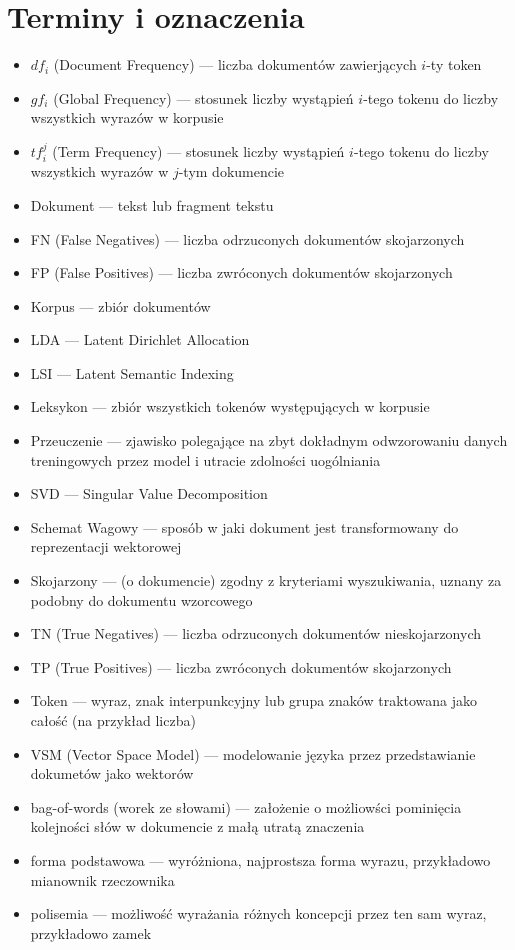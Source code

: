 \documentclass[11pt,a4paper]{article}
\begin{document}
\pagebreak

\section{Terminy i oznaczenia}
\label{sec:terms}

\begin{itemize}
\item $df_i$ (Document Frequency) --- liczba dokumentów zawierjących $i$-ty token
\item $gf_i$ (Global Frequency) --- stosunek liczby wystąpień $i$-tego tokenu do liczby wszystkich wyrazów w korpusie
\item $tf_i^j$ (Term Frequency) --- stosunek liczby wystąpień $i$-tego tokenu do liczby wszystkich wyrazów w $j$-tym dokumencie
\item Dokument --- tekst lub fragment tekstu
\item FN (False Negatives) --- liczba odrzuconych dokumentów skojarzonych
\item FP (False Positives) --- liczba zwróconych dokumentów skojarzonych
\item Korpus --- zbiór dokumentów
\item LDA --- Latent Dirichlet Allocation
\item LSI --- Latent Semantic Indexing
\item Leksykon --- zbiór wszystkich tokenów występujących w korpusie
\item Przeuczenie --- zjawisko polegające na zbyt dokładnym odwzorowaniu danych treningowych przez model i utracie zdolności uogólniania
\item SVD --- Singular Value Decomposition
\item Schemat Wagowy --- sposób w jaki dokument jest transformowany do reprezentacji wektorowej
\item Skojarzony --- (o dokumencie) zgodny z kryteriami wyszukiwania, uznany za podobny do dokumentu wzorcowego
\item TN (True Negatives) --- liczba odrzuconych dokumentów nieskojarzonych
\item TP (True Positives) --- liczba zwróconych dokumentów skojarzonych
\item Token --- wyraz, znak interpunkcyjny lub grupa znaków traktowana jako całość (na przykład liczba)
\item VSM (Vector Space Model) --- modelowanie języka przez przedstawianie dokumetów jako wektorów
\item bag-of-words (worek ze słowami) --- założenie o możliowści pominięcia kolejności słów w dokumencie z małą utratą znaczenia
\item forma podstawowa --- wyróżniona, najprostsza forma wyrazu, przykładowo mianownik rzeczownika
\item polisemia --- możliwość wyrażania różnych koncepcji przez ten sam wyraz, przykładowo zamek
\end{itemize}
\end{document}
